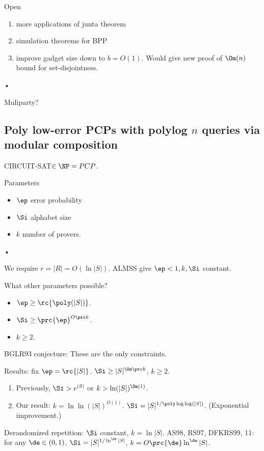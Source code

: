 Open
\begin{enumerate}
\item
more applications of junta theorem
\item
simulation theorems for BPP
\item
improve gadget size down to $b=O(1)$. Would give new proof of $\Om(n)$ bound for set-disjointness.
\end{enumerate}•

Muliparty?

\subsection{Poly low-error PCPs with polylog $n$ queries via modular composition}

CIRCUIT-SAT$\in \NP=PCP$.

Parameters
\begin{itemize}
\item
$\ep$ error probability
\item
$\Si$ alphabet size
\item
$k$ number of provers.
\end{itemize}•

We require $r=|R|=O(\ln|S|)$. ALMSS give $\ep<1,k,\Si$ constant.

What other parameters possible?
\begin{itemize}
\item
$\ep\ge \rc{\poly(|S|)}$. %
\item
$\Si \ge \prc{\ep}^{O\prc k}$.
\item 
$k\ge 2$.
\end{itemize}
BGLR93 conjecture: These are the only constraints. 

Results: fix $\ep=\rc{|S|}$. $\Si \ge |S|^{\Om\prc k}$, $k\ge 2$.
\begin{enumerate}
\item
Previously, $\Si>e^{|S|}$ or $k>\ln(|S|)^{\Om(1)}$.
\item
Our result: $k=\ln\ln (|S|)^{O(1)}$.
$\Si=|S|^{1/\poly\log\log(|S|)}$. (Exponential improvement.)
\end{enumerate}

Derandomized repetition: $\Si$ constant, $k=\ln|S|$. AS98, RS97, DFKRS99, 11: for any $\de\in(0,1)$, $\Si = |S|^{1/\ln^\de|S|}$, $k=O\prc{\de}\ln^\de|S|$.

